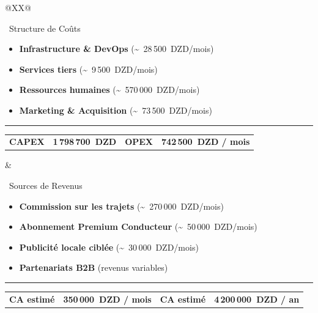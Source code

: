 \documentclass[11pt,a4paper]{article}
\begin{document}
\begin{landscape}
\begin{tabularx}{\linewidth}{@{}XX@{}}%
\begin{bmcblock}[height=4.2cm]{\faCoins~Structure de Coûts}%
\scriptsize
\begin{itemize}[leftmargin=1.5em, itemsep=1pt, parsep=0pt, topsep=2pt, partopsep=0pt]
  \item \textbf{Infrastructure \& DevOps} (\textasciitilde~28\,500~DZD/mois)
  \item \textbf{Services tiers} (\textasciitilde~9\,500~DZD/mois)
  \item \textbf{Ressources humaines} (\textasciitilde~570\,000~DZD/mois)
  \item \textbf{Marketing \& Acquisition} (\textasciitilde~73\,500~DZD/mois)
\end{itemize}
\vspace*{\fill}
\hrule
\vspace{0.1cm}
\centering
\begin{tabular}{l@{~:~}l@{\qquad\qquad}l@{~:~}l}
\textcolor{bmcgreen}{\textbf{CAPEX}} & \textbf{1\,798\,700~DZD} &
\textcolor{bmcgreen}{\textbf{OPEX}} & \textbf{742\,500~DZD / mois}
\end{tabular}
\end{bmcblock} &%
\begin{bmcblock}[height=4.2cm]{\faMoneyBillWave~Sources de Revenus}%
\scriptsize
\begin{itemize}[leftmargin=1.5em, itemsep=1pt, parsep=0pt, topsep=2pt, partopsep=0pt]
  \item \textbf{Commission sur les trajets} (\textasciitilde~270\,000~DZD/mois)
  \item \textbf{Abonnement Premium Conducteur} (\textasciitilde~50\,000~DZD/mois)
  \item \textbf{Publicité locale ciblée} (\textasciitilde~30\,000~DZD/mois)
  \item \textbf{Partenariats B2B} (revenus variables)
\end{itemize}
\vspace*{\fill}
\hrule
\vspace{0.1cm}
\centering
\begin{tabular}{l@{~:~}l@{\qquad\qquad}l@{~:~}l}
\textcolor{bmcgreen}{\textbf{CA estimé}} & \textbf{350\,000~DZD / mois} &
\textcolor{bmcgreen}{\textbf{CA estimé}} & \textbf{4\,200\,000~DZD / an}
\end{tabular}
\end{bmcblock} \\
\end{tabularx}

\vspace{0.4cm}
\label{tab:app-bmc}
\vspace*{\fill}
\end{landscape}
\restoregeometry
\end{document}
